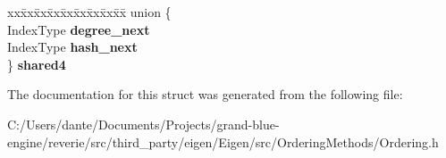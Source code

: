 \begin{DoxyCompactItemize}
\begin{tabbing}
\end{tabbing}\item 
\mbox{\label{struct_eigen_1_1internal_1_1colamd__col_ae50454c4d33746a5d58a220d0c4b1bee}} 
\begin{tabbing}
xx\=xx\=xx\=xx\=xx\=xx\=xx\=xx\=xx\=\kill
union \{\\
\>IndexType {\bfseries degree\_next}\\
\>IndexType {\bfseries hash\_next}\\
\} {\bfseries shared4}\\

\end{tabbing}\end{DoxyCompactItemize}


The documentation for this struct was generated from the following file\+:\begin{DoxyCompactItemize}
\item 
C\+:/\+Users/dante/\+Documents/\+Projects/grand-\/blue-\/engine/reverie/src/third\+\_\+party/eigen/\+Eigen/src/\+Ordering\+Methods/Ordering.\+h\end{DoxyCompactItemize}
